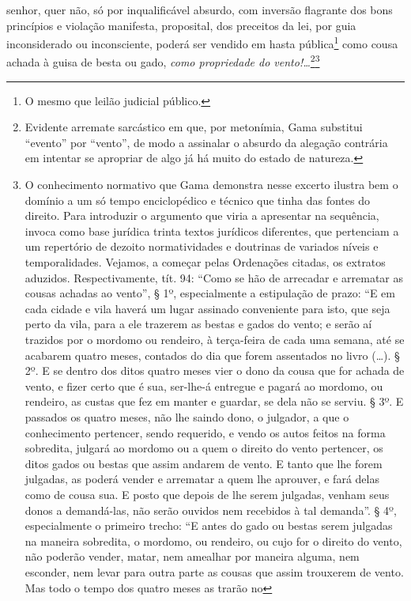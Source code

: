 senhor, quer não, só por inqualificável absurdo, com inversão flagrante
dos bons princípios e violação manifesta, proposital, dos preceitos da
lei, por guia inconsiderado ou inconsciente, poderá ser vendido em hasta
pública\footnote{O mesmo que leilão judicial público.} como cousa
achada à guisa de besta ou gado, \emph{como propriedade do
vento!\ldots{}}\footnote{Evidente arremate sarcástico em que, por
  metonímia, Gama substitui ``evento'' por ``vento'', de modo a assinalar o
  absurdo da alegação contrária em intentar se apropriar de algo já há
  muito do estado de natureza.}\footnote{O conhecimento normativo que
  Gama demonstra nesse excerto ilustra bem o domínio a um só tempo
  enciclopédico e técnico que tinha das fontes do direito. Para
  introduzir o argumento que viria a apresentar na sequência, invoca
  como base jurídica trinta textos jurídicos diferentes, que pertenciam
  a um repertório de dezoito normatividades e doutrinas de variados
  níveis e temporalidades.
  Vejamos, a começar pelas Ordenações citadas,
  os extratos aduzidos. Respectivamente, tít. 94: ``Como se hão de
  arrecadar e arrematar as cousas achadas ao vento'', § 1º,
  especialmente a estipulação de prazo: ``E em cada cidade e vila
  haverá um lugar assinado conveniente para isto, que seja perto da
  vila, para a ele trazerem as bestas e gados do vento; e serão aí
  trazidos por o mordomo ou rendeiro, à terça-feira de cada uma semana,
  até se acabarem quatro meses, contados do dia que forem assentados no
  livro (\ldots{}). § 2º. E se dentro dos ditos quatro meses vier o dono da
  cousa que for achada de vento, e fizer certo que é sua, ser-lhe-á
  entregue e pagará ao mordomo, ou rendeiro, as custas que fez em manter
  e guardar, se dela não se serviu. § 3º. E passados os quatro meses,
  não lhe saindo dono, o julgador, a que o conhecimento pertencer, sendo
  requerido, e vendo os autos feitos na forma sobredita, julgará ao
  mordomo ou a quem o direito do vento pertencer, os ditos gados ou
  bestas que assim andarem de vento. E tanto que lhe forem julgadas, as
  poderá vender e arrematar a quem lhe aprouver, e fará delas como de
  cousa sua. E posto que depois de lhe serem julgadas, venham seus donos
  a demandá-las, não serão ouvidos nem recebidos à tal demanda''. § 4º,
  especialmente o primeiro trecho: ``E antes do gado ou bestas serem
  julgadas na maneira sobredita, o mordomo, ou rendeiro, ou cujo for o
  direito do vento, não poderão vender, matar, nem amealhar por maneira
  alguma, nem esconder, nem levar para outra parte as cousas que assim
  trouxerem de vento. Mas todo o tempo dos quatro meses as trarão no
}
